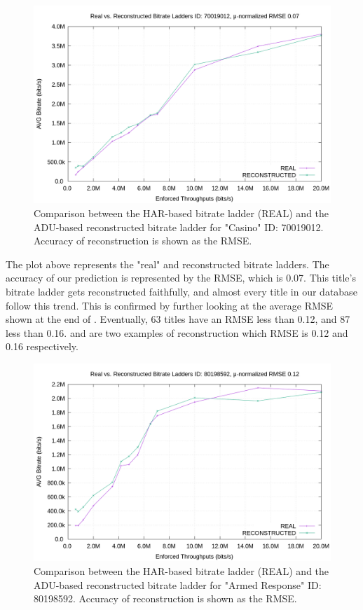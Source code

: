 \begin{figure}[!h]
  \centering
  \includegraphics[width=\columnwidth]{img/70019012.png}
  \caption{Comparison between the HAR-based bitrate ladder (REAL) and the
  ADU-based reconstructed bitrate ladder for "Casino" ID: 70019012. Accuracy of
  reconstruction is shown as the RMSE.}
  \label{fig:bl_comparison_good}
\end{figure}

The plot above represents the "real" and reconstructed bitrate ladders.  The
accuracy of our prediction is represented by the RMSE, which is 0.07.  This
title's bitrate ladder gets reconstructed faithfully, and almost every title in
our database follow this trend. This is confirmed by further looking at the
average RMSE shown at the end of . Eventually,
63 titles have an RMSE less than 0.12, and 87 less than 0.16.
 and  are two
examples of reconstruction which RMSE is 0.12 and 0.16 respectively.

\begin{figure}[!h]
  \centering
  \includegraphics[width=\columnwidth]{img/80198592}
  \caption{Comparison between the HAR-based bitrate ladder (REAL) and the
  ADU-based reconstructed bitrate ladder for "Armed Response" ID: 80198592.
  Accuracy of reconstruction is shown as the RMSE.}
  \label{fig:bl_comparison_good_1}
\end{figure}

